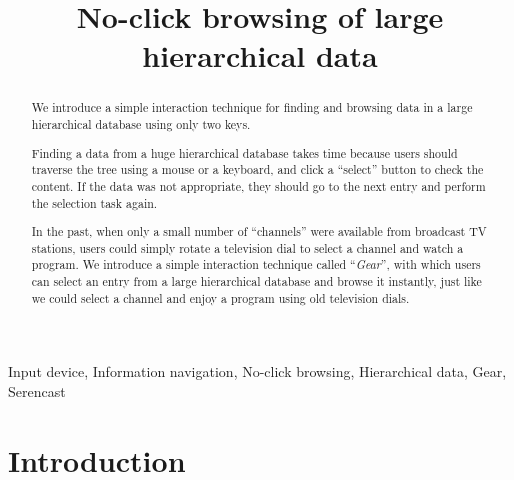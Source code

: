 \documentclass[conference]{IEEEtran}
\begin{document}
\title{No-click browsing of large hierarchical data}
%
%

\author{
}

\maketitle

\begin{abstract}
We introduce a simple interaction technique for finding and browsing
data in a large hierarchical database using only two keys.

Finding a data from a huge hierarchical database takes time
because users should traverse the tree using a mouse or a keyboard,
and click a ``select'' button to check the content.
If the data was not appropriate,
they should go to the next entry and perform the selection task again.

In the past, when only a small number of ``channels'' were available
from broadcast TV stations, users could simply rotate
a television dial to select a channel and watch a program.
We introduce a simple interaction technique called ``\textit{Gear}'',
with which users can select an entry from a large hierarchical database and
browse it instantly, just like we could select a channel and enjoy a program
using old television dials.
\end{abstract}

\begin{IEEEkeywords}
  Input device, Information navigation, No-click browsing,
  Hierarchical data, Gear, Serencast
\end{IEEEkeywords}


\section{Introduction}

% 
\end{document}
